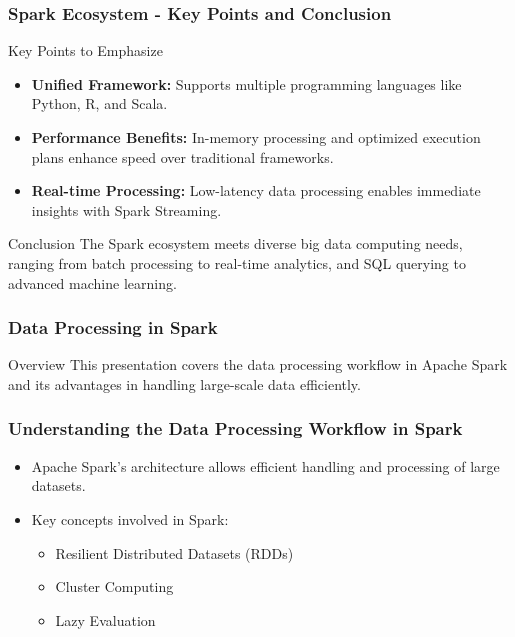 \documentclass[aspectratio=169]{beamer}
\begin{document}
\begin{frame}[fragile]
    \frametitle{Spark Ecosystem - Key Points and Conclusion}
    \begin{block}{Key Points to Emphasize}
        \begin{itemize}
            \item \textbf{Unified Framework:} Supports multiple programming languages like Python, R, and Scala.
            \item \textbf{Performance Benefits:} In-memory processing and optimized execution plans enhance speed over traditional frameworks.
            \item \textbf{Real-time Processing:} Low-latency data processing enables immediate insights with Spark Streaming.
        \end{itemize}
    \end{block}

    \begin{block}{Conclusion}
        The Spark ecosystem meets diverse big data computing needs, ranging from batch processing to real-time analytics, and SQL querying to advanced machine learning.
    \end{block}
\end{frame}

\begin{frame}
    \frametitle{Data Processing in Spark}
    \begin{block}{Overview}
        This presentation covers the data processing workflow in Apache Spark and its advantages in handling large-scale data efficiently.
    \end{block}
\end{frame}

\begin{frame}
    \frametitle{Understanding the Data Processing Workflow in Spark}
    \begin{itemize}
        \item Apache Spark's architecture allows efficient handling and processing of large datasets.
        \item Key concepts involved in Spark:
        \begin{itemize}
            \item Resilient Distributed Datasets (RDDs)
            \item Cluster Computing
            \item Lazy Evaluation
        \end{itemize}
    \end{itemize}
\end{frame}
\end{document}
